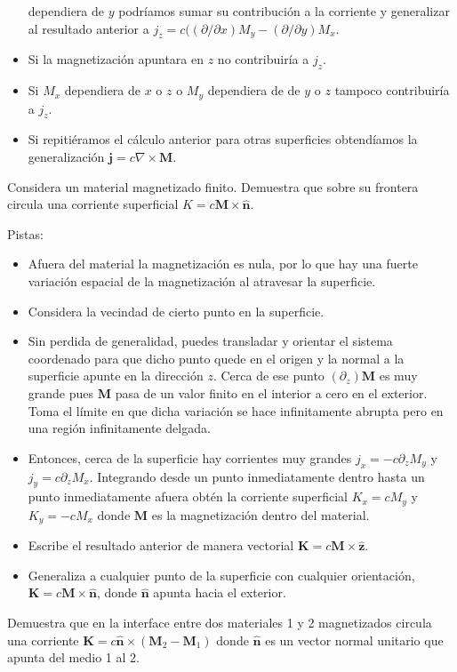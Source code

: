 \documentclass{exam}
\begin{document}
\begin{questions}
\begin{itemize}
    dependiera de $y$ podríamos sumar su contribución a la corriente y
    generalizar al resultado anterior a $j_z=c((\partial/\partial
    x)M_y-(\partial/\partial y)M_x$.
  \item Si la magnetización apuntara en $z$ no contribuiría a $j_z$.
  \item Si $M_x$ dependiera de $x$ o $z$ o $M_y$ dependiera de de $y$
    o $z$ tampoco contribuiría a $j_z$.
  \item Si repitiéramos el cálculo anterior para otras superficies
    obtendíamos la generalización
    $\bm j=c\nabla\times \bm M$.
  \end{itemize}

\question Considera un material magnetizado finito. Demuestra que
  sobre su frontera circula una corriente superficial $K=c\bm M\times
  \hat{\bm n}$.

  Pistas:
  \begin{itemize}
  \item Afuera del material la magnetización es nula, por lo que hay
    una fuerte variación espacial de la magnetización al atravesar la
    superficie.
  \item Considera la vecindad de cierto punto en la superficie.
  \item Sin perdida de generalidad, puedes transladar y orientar
    el sistema coordenado para que dicho punto quede en el origen
    y la normal a la superficie apunte en la dirección $z$. Cerca de
    ese punto $(\partial_z)\bm M$ es muy grande pues $\bm M$
    pasa de un valor finito en el interior a cero en el
    exterior. Toma el límite en que dicha variación se hace
    infinitamente abrupta pero en una región infinitamente delgada.
  \item Entonces, cerca de la superficie hay corrientes muy grandes
    $j_x=-c\partial_z M_y$ y $j_y=c\partial_z M_x$. Integrando desde
    un punto inmediatamente dentro hasta un punto inmediatamente afuera
    obtén la corriente superficial $K_x=cM_y$ y $K_y=-cM_x$ donde
    $\bm M$ es la magnetización dentro del material.
  \item Escribe el resultado anterior de manera vectorial $\bm
    K=c \bm M\times\hat{\bm z}$.
  \item Generaliza a cualquier punto de la superficie con cualquier
    orientación,  $\bm K=c \bm M\times\hat{\bm n}$, donde $\hat{\bm
      n}$ apunta hacia el exterior.
  \end{itemize}

\question Demuestra que en la interface entre dos materiales 1 y 2
  magnetizados circula una corriente $\bm K=c\hat{\bm n}\times(\bm
  M_2-\bm M_1)$ donde $\hat{\bm n}$ es un vector normal unitario que
  apunta del medio 1 al 2.


\end{questions}
\end{document}
